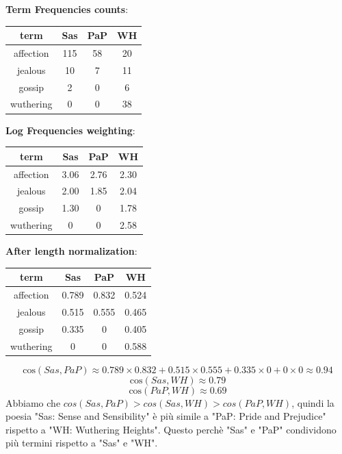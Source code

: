 \documentclass{report}
\begin{document}
	\textbf{Term Frequencies counts}:
	\begin{table}[H]
		\centering
		\begin{tabular}{|c|c|c|c|}
			\hline
			 term & Sas & PaP & WH \\
			\hline
			 affection & 115 & 58 & 20 \\
			 jealous & 10 & 7 & 11 \\
			 gossip & 2 & 0 & 6 \\
			 wuthering & 0 & 0 & 38 \\
			\hline
		\end{tabular} 
	\end{table}
	\textbf{Log Frequencies weighting}:
	\begin{table}[H]
		\centering
		\begin{tabular}{|c|c|c|c|}
			\hline
			 term & Sas & PaP & WH \\
			\hline
			 affection & 3.06 & 2.76 & 2.30 \\
			 jealous & 2.00 & 1.85 & 2.04 \\
			 gossip & 1.30 & 0 & 1.78 \\
			 wuthering & 0 & 0 & 2.58 \\
			\hline
		\end{tabular} 
	\end{table}
	\textbf{After length normalization}:
	\begin{table}[H]
		\centering
		\begin{tabular}{|c|c|c|c|}
			\hline
			 term & Sas & PaP & WH \\
			\hline
			 affection & 0.789 & 0.832 & 0.524 \\
			 jealous & 0.515 & 0.555 & 0.465 \\
			 gossip & 0.335 & 0 & 0.405 \\
			 wuthering & 0 & 0 & 0.588 \\
			\hline
		\end{tabular} 
	\end{table}
	\[
		\text{cos}(Sas, PaP) \approx 0.789 \times 0.832 + 0.515 \times 0.555 + 0.335 \times 0 + 0 \times 0 \approx 0.94 
	\]
	\[
		\text{cos}(Sas, WH) \approx 0.79
	\]
	\[
		\text{cos}(PaP, WH) \approx 0.69
	\]
	Abbiamo che $cos(Sas, PaP) > cos(Sas, WH) > cos(PaP, WH)$, quindi la poesia "Sas: Sense and Sensibility" è più simile a "PaP: Pride and Prejudice" rispetto a "WH: Wuthering Heights". Questo perchè "Sas" e "PaP" condividono più termini rispetto a "Sas" e "WH".
\end{document}
